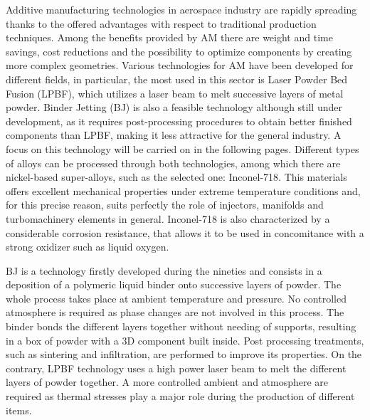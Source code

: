 Additive manufacturing technologies in aerospace industry are rapidly spreading thanks to the offered advantages with respect to traditional production techniques. Among the benefits provided by AM there are weight and time savings, cost reductions and  the possibility to optimize components by creating more complex geometries\cite{materials_and_desing}.
Various technologies for AM have been developed for different fields, in particular, the most used in this sector is Laser Powder Bed Fusion (LPBF), which utilizes a laser beam to melt successive layers of metal powder. Binder Jetting (BJ) is also a feasible technology although still under development, as it requires post-processing procedures to obtain better finished components than LPBF, making it less attractive for the general industry. A focus on this technology will be carried on in the following pages. Different types of alloys can be processed through both technologies, among which there are nickel-based super-alloys, such as the selected one: Inconel-718. This materials offers excellent mechanical properties under extreme temperature conditions and, for this precise reason, suits perfectly the role of injectors, manifolds and turbomachinery elements in general. Inconel-718 is also characterized by a considerable corrosion resistance, that allows it to be used in concomitance with a strong oxidizer such as liquid oxygen\cite{Inconel_vs_steel}.

BJ is a technology firstly developed during the nineties and consists in a deposition of a polymeric liquid binder onto successive layers of powder. The whole process takes place at ambient temperature and pressure. No controlled atmosphere is required as phase changes are not involved in this process. The binder bonds the different layers together without needing of supports, resulting in a box of powder with a 3D component built inside. Post processing treatments, such as sintering and infiltration, are performed to improve its properties\cite{bj_inconel}. On the contrary, LPBF technology uses a high power laser beam to melt the different layers of powder together. A more controlled ambient and atmosphere are required as thermal stresses play a major role during the production of different items\cite{materials_and_desing}.

